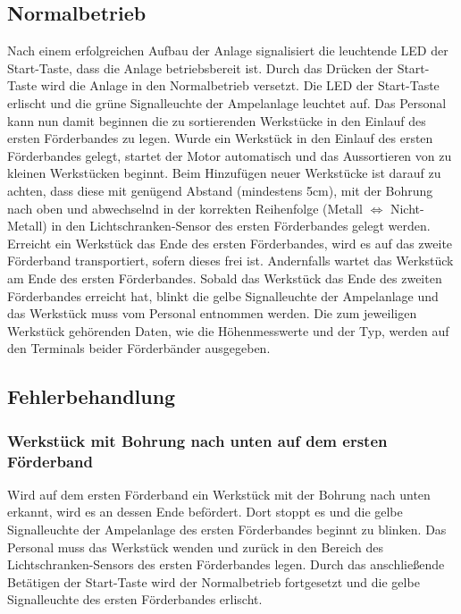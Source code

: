 \documentclass[oneside,a4paper,titlepage]{scrartcl} %
\begin{document}
\subsection{Normalbetrieb}
Nach einem erfolgreichen Aufbau der Anlage signalisiert die leuchtende LED der Start-Taste, dass die Anlage betriebsbereit ist. Durch das Drücken der Start-Taste wird die Anlage in den Normalbetrieb versetzt.\newline
\newline
Die LED der Start-Taste erlischt und die grüne Signalleuchte der Ampelanlage leuchtet auf.\newline
\newline
Das Personal kann nun damit beginnen die zu sortierenden Werkstücke in den Einlauf des ersten Förderbandes zu legen.\newline
\newline
Wurde ein Werkstück in den Einlauf des ersten Förderbandes gelegt, startet der Motor automatisch und das Aussortieren von zu kleinen Werkstücken beginnt.\newline
Beim Hinzufügen neuer Werkstücke ist darauf zu achten, dass diese mit genügend Abstand (mindestens 5cm), mit der Bohrung nach oben und abwechselnd in der korrekten Reihenfolge (Metall $\Leftrightarrow$ Nicht-Metall) in den Lichtschranken-Sensor des ersten Förderbandes gelegt werden.\newline
\newline
Erreicht ein Werkstück das Ende des ersten Förderbandes, wird es auf das zweite Förderband transportiert, sofern dieses frei ist. Andernfalls wartet das Werkstück am Ende des ersten Förderbandes.\newline
\newline
Sobald das Werkstück das Ende des zweiten Förderbandes erreicht hat, blinkt die gelbe Signalleuchte der Ampelanlage und das Werkstück muss vom Personal entnommen werden.\newline
\newline
Die zum jeweiligen Werkstück gehörenden Daten, wie die Höhenmesswerte und der Typ, werden auf den Terminals beider Förderbänder ausgegeben.

\newpage

\subsection{Fehlerbehandlung}
\subsubsection{Werkstück mit Bohrung nach unten auf dem ersten Förderband}
Wird auf dem ersten Förderband ein Werkstück mit der Bohrung nach unten erkannt, wird es an dessen Ende befördert. Dort stoppt es und die gelbe Signalleuchte der Ampelanlage des ersten Förderbandes beginnt zu blinken. Das Personal muss das Werkstück wenden und zurück in den Bereich des Lichtschranken-Sensors des ersten Förderbandes legen. Durch das anschließende Betätigen der Start-Taste wird der Normalbetrieb fortgesetzt und die gelbe Signalleuchte des ersten Förderbandes erlischt.
\end{document}
